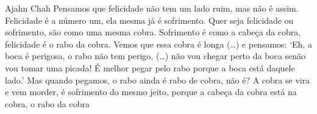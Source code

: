 
\cleartoverso

\begin{quotepage}{0.6}{Ajahn Chah}
Pensamos que felicidade não tem um lado ruim, mas não é assim.
Felicidade é a número um, ela mesma já é sofrimento. Quer seja
felicidade ou sofrimento, são como uma mesma cobra. Sofrimento é como a
cabeça da cobra, felicidade é o rabo da cobra. Vemos que essa cobra é
longa (…) e pensamos: ‘Eh, a boca é perigosa, o rabo não tem perigo,
(…) não vou chegar perto da boca senão vou tomar uma picada! É melhor
pegar pelo rabo porque a boca está daquele lado.’ Mas quando pegamos, o
rabo ainda é rabo de cobra, não é? A cobra se vira e vem morder, é
sofrimento do mesmo jeito, porque a cabeça da cobra está na cobra, o
rabo da cobra 
\end{quotepage}

